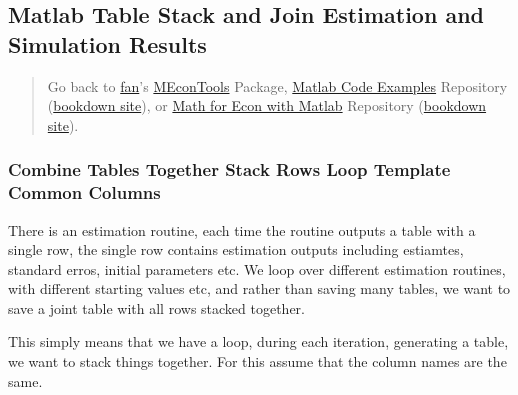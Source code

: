 \documentclass[
]{book}
\begin{document}
\hypertarget{matlab-table-stack-and-join-estimation-and-simulation-results}{%
\subsection{Matlab Table Stack and Join Estimation and Simulation Results}\label{matlab-table-stack-and-join-estimation-and-simulation-results}}

\begin{quote}
Go back to \href{http://fanwangecon.github.io/}{fan}'s \href{https://fanwangecon.github.io/MEconTools/}{MEconTools} Package, \href{https://fanwangecon.github.io/M4Econ/}{Matlab Code Examples} Repository (\href{https://fanwangecon.github.io/M4Econ/bookdown}{bookdown site}), or \href{https://fanwangecon.github.io/Math4Econ/}{Math for Econ with Matlab} Repository (\href{https://fanwangecon.github.io/Math4Econ/bookdown}{bookdown site}).
\end{quote}

\hypertarget{combine-tables-together-stack-rows-loop-template-common-columns}{%
\subsubsection{Combine Tables Together Stack Rows Loop Template Common Columns}\label{combine-tables-together-stack-rows-loop-template-common-columns}}

There is an estimation routine, each time the routine outputs a table
with a single row, the single row contains estimation outputs including
estiamtes, standard erros, initial parameters etc. We loop over
different estimation routines, with different starting values etc, and
rather than saving many tables, we want to save a joint table with all
rows stacked together.

This simply means that we have a loop, during each iteration, generating
a table, we want to stack things together. For this assume that the
column names are the same.
\end{document}
